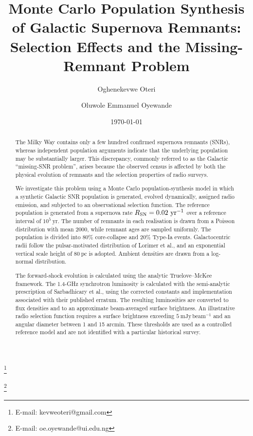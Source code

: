 \documentclass[
aps,
prd,
reprint,
superscriptaddress,
nofootinbib
]{revtex4-2}
\newcommand{\yr}{\mathrm{yr}}
\newcommand{\pc}{\mathrm{pc}}
\begin{document}
	
	\title{Monte Carlo Population Synthesis of Galactic Supernova Remnants:
		Selection Effects and the Missing-Remnant Problem}
	
	\author{Oghenekevwe Oteri}
	\thanks{E-mail: kevweoteri@gmail.com}
	\author{Oluwole Emmanuel Oyewande}
	\thanks{E-mail: oe.oyewande@ui.edu.ng}
	
	\date{\today}
	
	\begin{abstract}
		
		The Milky Way contains only a few hundred confirmed supernova remnants
		(SNRs), whereas independent population arguments indicate that the underlying
		population may be substantially larger.  This discrepancy, commonly referred
		to as the Galactic ``missing-SNR problem'', arises because the observed census
		is affected by both the physical evolution of remnants and the selection
		properties of radio surveys.
		
		We investigate this problem using a Monte Carlo population-synthesis model in
		which a synthetic Galactic SNR population is generated, evolved dynamically,
		assigned radio emission, and subjected to an observational selection function.
		The reference population is generated from a supernova rate
		$R_{\rm SN}=0.02~\mathrm{yr^{-1}}$ over a reference interval of
		$10^5~\yr$.  The number of remnants in each realisation is drawn from a
		Poisson distribution with mean 2000, while remnant ages are sampled uniformly.
		The population is divided into 80\% core-collapse and 20\% Type-Ia events.
		Galactocentric radii follow the pulsar-motivated distribution of Lorimer et al.,
		and an exponential vertical scale height of $80~\pc$ is adopted.  Ambient
		densities are drawn from a log-normal distribution.
		
		The forward-shock evolution is calculated using the analytic
		Truelove--McKee framework.  The 1.4-GHz synchrotron luminosity is calculated
		with the semi-analytic prescription of Sarbadhicary et al., using the corrected
		constants and implementation associated with their published erratum.  The
		resulting luminosities are converted to flux densities and to an approximate
		beam-averaged surface brightness.  An illustrative radio selection function
		requires a surface brightness exceeding $5~\mathrm{mJy\,beam^{-1}}$ and an
		angular diameter between 1 and 15 arcmin.  These thresholds are used as a
		controlled reference model and are not identified with a particular historical
		survey.
		

\end{abstract}
\end{document}
